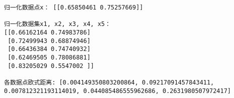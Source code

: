 \documentclass[11pt]{article}
\begin{document}
    \begin{Verbatim}[commandchars=\\\{\}]
归一化数据点x： [[0.65850461 0.75257669]]

归一化数据集x1, x2, x3, x4, x5：
[[0.66162164 0.74983786]
 [0.72499943 0.68874946]
 [0.66436384 0.74740932]
 [0.62469505 0.78086881]
 [0.83205029 0.5547002 ]]

各数据点欧式距离: [0.004149350803200864, 0.09217091457843411, 0.007812321193114019, 0.044085486555962686, 0.2631980507972417]

    \end{Verbatim}


    
    
    
    
\end{document}
